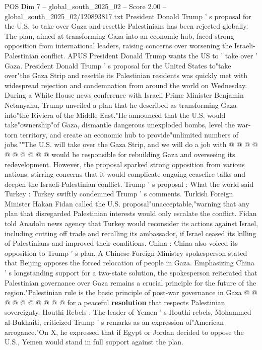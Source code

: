 \begin{textsample}{POS Dim 7 – global\_south\_2025\_02 – Score 2.00 – global\_south\_2025\_02/120893817.txt}  \label{ex:f7_pos_185}
President Donald Trump ' s proposal for the U.S. to take over Gaza and resettle Palestinians has been rejected globally.
The plan, aimed at transforming Gaza into an economic hub, faced strong opposition from international leaders, raising concerns over worsening the Israeli-Palestinian conflict.
APUS President Donald Trump wants the US to ' take over ' Gaza.
President Donald Trump ' s proposal for the United States to"take over"the Gaza Strip and resettle its Palestinian residents was quickly met with widespread rejection and condemnation from around the world on Wednesday.
During a White House news conference with Israeli Prime Minister Benjamin Netanyahu, Trump unveiled a plan that he described as transforming Gaza into"the Riviera of the Middle East."He announced that the U.S. would take"ownership"of Gaza, dismantle dangerous unexploded bombs, level the war-torn territory, and create an economic hub to provide"unlimited numbers of jobs.""The U.S. will take over the Gaza Strip, and we will do a job with @ @ @ @ @ @ @ @ @ @ would be responsible for rebuilding Gaza and overseeing its redevelopment.
However, the proposal sparked strong opposition from various nations, stirring concerns that it would complicate ongoing ceasefire talks and deepen the Israeli-Palestinian conflict.
Trump ' s proposal : What the world said Turkey : Turkey swiftly condemned Trump ' s comments.
Turkish Foreign Minister Hakan Fidan called the U.S. proposal"unacceptable,"warning that any plan that disregarded Palestinian interests would only escalate the conflict.
Fidan told Anadolu news agency that Turkey would reconsider its actions against Israel, including cutting off trade and recalling its ambassador, if Israel ceased its killing of Palestinians and improved their conditions.
China : China also voiced its opposition to Trump ' s plan.
A Chinese Foreign Ministry spokesperson stated that Beijing opposes the forced relocation of people in Gaza.
Emphasizing China ' s longstanding support for a two-state solution, the spokesperson reiterated that Palestinian governance over Gaza remains a crucial principle for the future of the region."Palestinian rule is the basic principle of post-war governance in Gaza @ @ @ @ @ @ @ @ @ @ for a peaceful \textbf{resolution} that respects Palestinian sovereignty.
Houthi Rebels : The leader of Yemen ' s Houthi rebels, Mohammed al-Bukhaiti, criticized Trump ' s remarks as an expression of"American arrogance."On X, he expressed that if Egypt or Jordan decided to oppose the U.S., Yemen would stand in full support against the plan.

\end{textsample}
